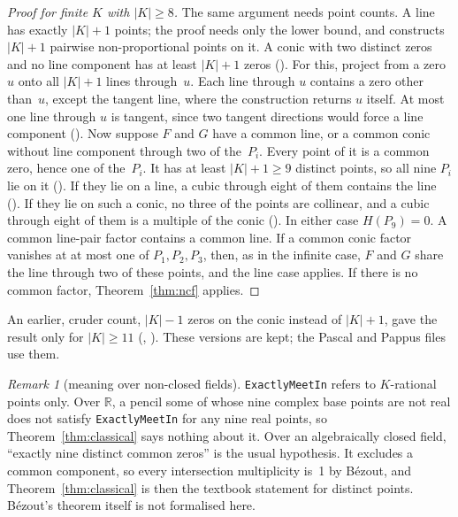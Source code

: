 \documentclass[11pt]{article}
\theoremstyle{definition}
\theoremstyle{remark}
\newtheorem{remark}[theorem]{Remark}
\newcommand{\lean}[1]{\texttt{#1}}
\begin{document}
\begin{proof}[Proof for finite $K$ with $|K|\ge 8$]
The same argument needs point counts. A line has exactly $|K|+1$ points; the proof needs only the lower bound, and  constructs $|K|+1$ pairwise non-proportional points on it. A
conic with two distinct zeros and no line component has at least $|K|+1$ zeros
(). For this, project from a zero $u$ onto all $|K|+1$ lines through~$u$.
Each line through $u$ contains a zero other than~$u$, except the tangent line, where the
construction returns $u$ itself. At most one line through $u$ is tangent, since two tangent
directions would force a line component (). Now suppose $F$ and $G$ have a
common line, or a common conic without line component through two of the~$P_i$. Every point of it
is a common zero, hence one of the~$P_i$. It has at least $|K|+1\ge9$ distinct points, so all
nine $P_i$ lie on it (). If they lie on a line, a cubic through eight of them
contains the line (). If they lie on such a conic, no three of the
points are collinear, and a cubic through eight of them is a multiple of the conic
(). In either case $H(P_9)=0$. A common line-pair factor contains a
common line. If a common conic factor vanishes at at most one of $P_1,P_2,P_3$, then, as in the
infinite case, $F$ and $G$ share the line through two of these points, and the line case applies.
If there is no common factor, Theorem~\ref{thm:ncf} applies.
\end{proof}

An earlier, cruder count, $|K|-1$ zeros on the conic instead of $|K|+1$, gave the result only for
$|K|\ge 11$ (, ).
These versions are kept; the Pascal and Pappus files use them.

\begin{remark}[meaning over non-closed fields]
\lean{ExactlyMeetIn} refers to $K$-rational points only. Over $\mathbb{R}$, a pencil some of
whose nine complex base points are not real does not satisfy \lean{ExactlyMeetIn} for any nine
real points, so Theorem~\ref{thm:classical} says nothing about it. Over an algebraically closed
field, ``exactly nine distinct common zeros'' is the usual hypothesis. It excludes a common
component, so every intersection multiplicity is~1 by B\'ezout, and
Theorem~\ref{thm:classical} is then the textbook statement for distinct points. B\'ezout's theorem
itself is not formalised here.
\end{remark}
\end{document}
